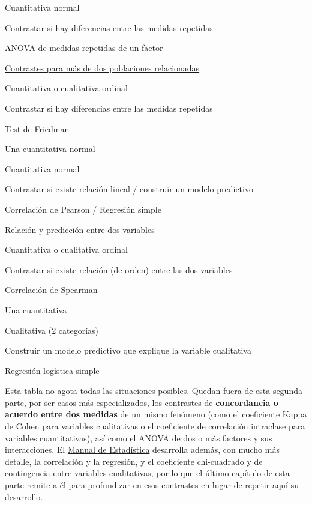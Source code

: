 \documentclass[
  spanish,
  a4paper,
]{scrreport}
\theoremstyle{definition}
\theoremstyle{definition}
\theoremstyle{remark}
\begin{document}
Cuantitativa normal

Contrastar si hay diferencias entre las medidas repetidas

ANOVA de medidas repetidas de un factor

\href{15-contrastes-medidas-repetidas.qmd}{Contrastes para más de dos
poblaciones relacionadas}

Cuantitativa o cualitativa ordinal

Contrastar si hay diferencias entre las medidas repetidas

Test de Friedman

Una cuantitativa normal

Cuantitativa normal

Contrastar si existe relación lineal / construir un modelo predictivo

Correlación de Pearson / Regresión simple

\href{16-relacion-entre-variables.qmd}{Relación y predicción entre dos
variables}

Cuantitativa o cualitativa ordinal

Contrastar si existe relación (de orden) entre las dos variables

Correlación de Spearman

Una cuantitativa

Cualitativa (2 categorías)

Construir un modelo predictivo que explique la variable cualitativa

Regresión logística simple

\begin{tcolorbox}[enhanced jigsaw, arc=.35mm, bottomrule=.15mm, bottomtitle=1mm, breakable, colback=white, colbacktitle=quarto-callout-note-color!10!white, colframe=quarto-callout-note-color-frame, coltitle=black, left=2mm, leftrule=.75mm, opacityback=0, opacitybacktitle=0.6, rightrule=.15mm, title=\textcolor{quarto-callout-note-color}{\faInfo}\hspace{0.5em}{Nota}, titlerule=0mm, toprule=.15mm, toptitle=1mm]

Esta tabla no agota todas las situaciones posibles. Quedan fuera de esta
segunda parte, por ser casos más especializados, los contrastes de
\textbf{concordancia o acuerdo entre dos medidas} de un mismo fenómeno
(como el coeficiente Kappa de Cohen para variables cualitativas o el
coeficiente de correlación intraclase para variables cuantitativas), así
como el ANOVA de dos o más factores y sus interacciones. El
\href{https://aprendeconalf.es/estadistica-manual/}{Manual de
Estadística} desarrolla además, con mucho más detalle, la correlación y
la regresión, y el coeficiente chi-cuadrado y de contingencia entre
variables cualitativas, por lo que el último capítulo de esta parte
remite a él para profundizar en esos contrastes en lugar de repetir aquí
su desarrollo.

\end{tcolorbox}
\end{document}
